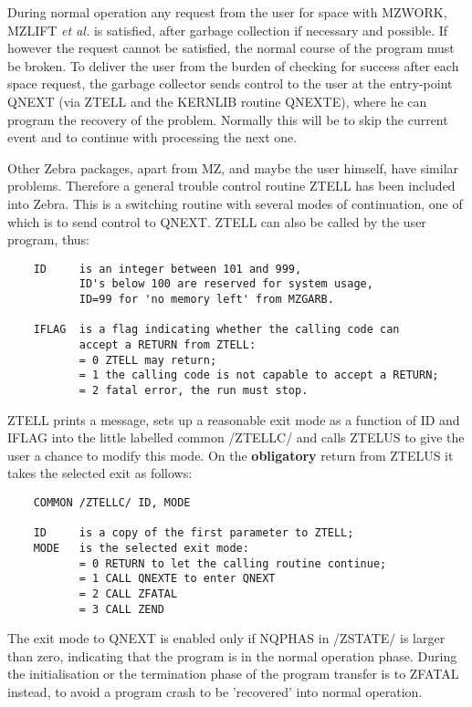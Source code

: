 During normal operation any request from the user for space
with MZWORK, MZLIFT {\it et al.} is satisfied,
after garbage collection if necessary and possible.
If however the request cannot be satisfied,
the normal course of the program must be broken.
To deliver the user from the burden of checking for success
after each space request,
the garbage collector sends control to the user at the
entry-point QNEXT (via ZTELL and the KERNLIB routine QNEXTE),
where he can program the recovery of the problem.
Normally this will be to skip the current event and to continue
with processing the next one.

Other Zebra packages, apart from MZ, and maybe the user himself,
have similar problems.
Therefore a general trouble control routine ZTELL has been
included into Zebra.
This is a switching routine with several modes of continuation,
one of which is to send control to QNEXT.
ZTELL can also be called by the user program, thus:


\begin{verbatim}
    ID     is an integer between 101 and 999,
           ID's below 100 are reserved for system usage,
           ID=99 for 'no memory left' from MZGARB.

    IFLAG  is a flag indicating whether the calling code can
           accept a RETURN from ZTELL:
           = 0 ZTELL may return;
           = 1 the calling code is not capable to accept a RETURN;
           = 2 fatal error, the run must stop.
\end{verbatim} 

ZTELL prints a message,
sets up a reasonable exit mode as a function of ID and IFLAG
into the little labelled common /ZTELLC/
and calls ZTELUS to give the user a chance to modify this mode.
On the
{\large\bf obligatory}
return from ZTELUS it takes the selected exit as follows:

\begin{verbatim}
    COMMON /ZTELLC/ ID, MODE

    ID     is a copy of the first parameter to ZTELL;
    MODE   is the selected exit mode:
           = 0 RETURN to let the calling routine continue;
           = 1 CALL QNEXTE to enter QNEXT
           = 2 CALL ZFATAL
           = 3 CALL ZEND
\end{verbatim} 

The exit mode to QNEXT is enabled only if NQPHAS in /ZSTATE/
is larger than zero, indicating that the program is
in the normal operation phase.
During the initialisation or the termination phase of the program
transfer is to ZFATAL instead,
to avoid a program crash to be 'recovered' into normal operation.

